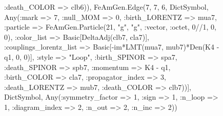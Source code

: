 \documentclass{revtex4}
\begin{document}
\begin{figure}[!htb]
\begin{center}
{:death_COLOR => clb6)), FeAmGen.Edge(7, 7, 6, Dict{Symbol, Any}(:mark => 7, :null_MOM => 0, :birth_LORENTZ => mua7, :particle => FeAmGen.Particle(21, "g", "g", :vector, :octet, 0//1, 0, 0), :color_list => Basic[DeltaAdj(clb7, cla7)], :couplings_lorentz_list => Basic[-im*LMT(mua7, mub7)*Den(K4 - q1, 0, 0)], :style => "Loop", :birth_SPINOR => spa7, :death_SPINOR => spb7, :momentum => K4 - q1, :birth_COLOR => cla7, :propagator_index => 3, :death_LORENTZ => mub7, :death_COLOR => clb7))], Dict{Symbol, Any}(:symmetry_factor => 1, :sign => 1, :n_loop => 1, :diagram_index => 2, :n_out => 2, :n_inc => 2)) 
}
\end{center}
\end{figure}
\end{document}
